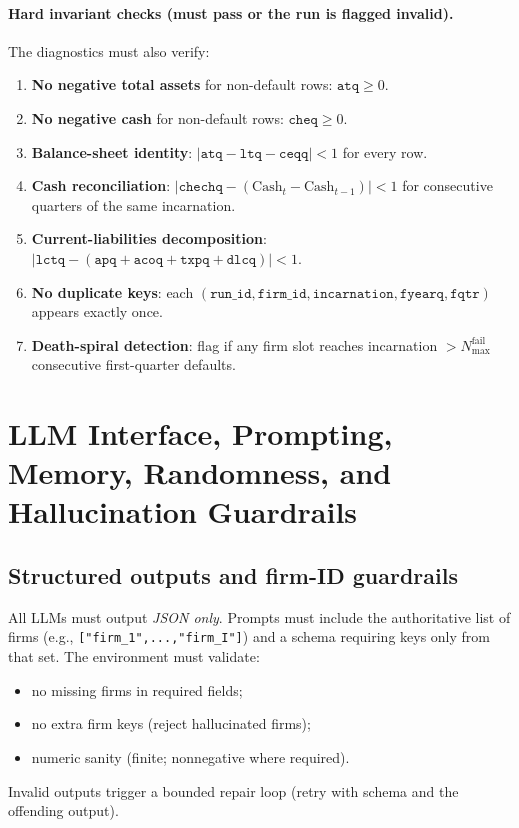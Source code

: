 \documentclass[11pt]{article}
\begin{document}
\paragraph{Hard invariant checks (must pass or the run is flagged invalid).}
The diagnostics must also verify:
\begin{enumerate}[leftmargin=*]
    \item \textbf{No negative total assets} for non-default rows: $\texttt{atq}\ge 0$.
    \item \textbf{No negative cash} for non-default rows: $\texttt{cheq}\ge 0$.
    \item \textbf{Balance-sheet identity}: $|\texttt{atq}-\texttt{ltq}-\texttt{ceqq}|<1$ for every row.
    \item \textbf{Cash reconciliation}: $|\texttt{chechq}-(\text{Cash}_t - \text{Cash}_{t-1})|<1$ for consecutive quarters of the same incarnation.
    \item \textbf{Current-liabilities decomposition}: $|\texttt{lctq}-(\texttt{apq}+\texttt{acoq}+\texttt{txpq}+\texttt{dlcq})|<1$.
    \item \textbf{No duplicate keys}: each $(\texttt{run\_id},\texttt{firm\_id},\texttt{incarnation},\texttt{fyearq},\texttt{fqtr})$ appears exactly once.
    \item \textbf{Death-spiral detection}: flag if any firm slot reaches incarnation $>N_{\max}^{\text{fail}}$ consecutive first-quarter defaults.
\end{enumerate}

\section{LLM Interface, Prompting, Memory, Randomness, and Hallucination Guardrails}

\subsection{Structured outputs and firm-ID guardrails}
All LLMs must output \emph{JSON only}. Prompts must include the authoritative list of firms (e.g., \texttt{["firm\_1",...,"firm\_I"]}) and a schema requiring keys only from that set. The environment must validate:
\begin{itemize}[leftmargin=*]
    \item no missing firms in required fields;
    \item no extra firm keys (reject hallucinated firms);
    \item numeric sanity (finite; nonnegative where required).
\end{itemize}
Invalid outputs trigger a bounded repair loop (retry with schema and the offending output).
\end{document}
